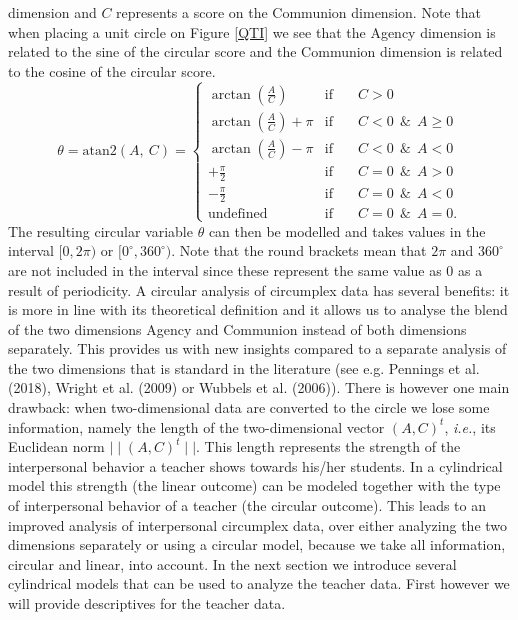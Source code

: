 \documentclass[man]{apa6}
\theoremstyle{definition}
\theoremstyle{definition}
\theoremstyle{definition}
\theoremstyle{remark}
\begin{document}
dimension and \(C\) represents a score on the Communion dimension. Note
that when placing a unit circle on Figure \ref{QTI} we see that the
Agency dimension is related to the sine of the circular score and the
Communion dimension is related to the cosine of the circular score.
\begin{equation}\label{PredVal}
\theta          = \text{atan2}\left(A, \: C\right)  =
\left\{{\begin{array}{lcl}
                                                                       \arctan\left(\frac{A}{C}\right) & \text{if}  \quad&C > 0 \\
\arctan\left(\frac{A}{C}\right) + \pi & \text{if}  \quad& C  <  0  \:\: \&\:\: A \geq 0\\
 \arctan\left(\frac{A}{C}\right) - \pi & \text{if}  \quad&C  <  0 \:\:  \&\:\:A  < 0\\
 +\frac{\pi}{2} & \text{if}  \quad& C  =  0  \:\: \&\:\:A > 0\\
 -\frac{\pi}{2} & \text{if}  \quad& C =  0  \:\: \&\:\:A < 0\\
 \text{undefined} & \text{if} \quad& C =  0   \:\: \&\:\:A = 0.
 \end{array}}
\right.
\end{equation} The resulting circular variable \(\theta\) can then be
modelled and takes values in the interval \([0, 2\pi)\) or
\([0^\circ, 360^\circ)\). Note that the round brackets mean that
\(2\pi\) and \(360^\circ\) are not included in the interval since these
represent the same value as 0 as a result of periodicity. \newline
\indent A circular analysis of circumplex data has several benefits: it
is more in line with its theoretical definition and it allows us to
analyse the blend of the two dimensions Agency and Communion instead of
both dimensions separately. This provides us with new insights compared
to a separate analysis of the two dimensions that is standard in the
literature (see e.g. Pennings et al. (2018), Wright et al. (2009) or
Wubbels et al. (2006)). There is however one main drawback: when
two-dimensional data are converted to the circle we lose some
information, namely the length of the two-dimensional vector
\((A, C)^t\), \emph{i.e.}, its Euclidean norm
\(\mid\mid (A, C)^t \mid\mid\). This length represents the strength of
the interpersonal behavior a teacher shows towards his/her students. In
a cylindrical model this strength (the linear outcome) can be modeled
together with the type of interpersonal behavior of a teacher (the
circular outcome). This leads to an improved analysis of interpersonal
circumplex data, over either analyzing the two dimensions separately or
using a circular model, because we take all information, circular and
linear, into account. In the next section we introduce several
cylindrical models that can be used to analyze the teacher data. First
however we will provide descriptives for the teacher data.
\end{document}

